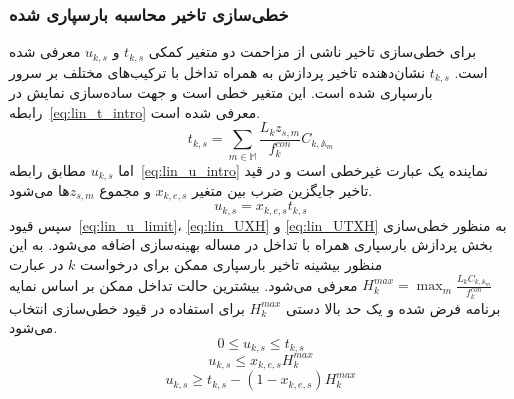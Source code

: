 \subsubsection{خطی‌سازی تاخیر محاسبه بارسپاری شده}
برای خطی‌سازی تاخیر ناشی از مزاحمت دو متغیر کمکی $t_{k,s}$ و $u_{k,s}$ معرفی شده است. $t_{k,s}$ نشان‌دهنده تاخیر پردازش به همراه تداخل با ترکیب‌های مختلف بر سرور بارسپاری شده است. این متغیر خطی است و جهت ساده‌سازی نمایش در رابطه~\eqref{eq:lin_t_intro} معرفی شده است.
\begin{equation} \label{eq:lin_t_intro}
    t_{k,s} = \sum_{m \in \mathbb{M}}\frac{L_k z_{s,m}}{f^{con}_k} C_{k,\mathbb{A}_m}
\end{equation}
اما $u_{k,s}$ مطابق رابطه~\eqref{eq:lin_u_intro} نماینده یک عبارت غیرخطی است و در قید تاخیر جایگزین ضرب بین متغیر $x_{k,e,s}$ و مجموع $z_{s,m}$ها می‌شود.
\begin{equation} \label{eq:lin_u_intro}
    u_{k,s} = x_{k,e,s} t_{k,s}
\end{equation}
سپس قیود~\eqref{eq:lin_u_limit}، \eqref{eq:lin_UXH} و \eqref{eq:lin_UTXH} به منظور خطی‌سازی بخش پردازش بارسپاری همراه با تداخل در مساله بهینه‌سازی اضافه می‌شود. به این منظور بیشینه تاخیر بارسپاری ممکن برای درخواست $k$ در عبارت $H^{max}_k = \max_m \frac{L_k C_{k,\mathbb{A}_m}}{f^{con}_k}$ معرفی می‌شود. بیشترین حالت تداخل ممکن بر اساس نمایه برنامه فرض شده و یک حد بالا دستی $H^{max}_k$ برای استفاده در قیود خطی‌سازی انتخاب می‌شود.
\begin{equation} \label{eq:lin_u_limit}
    0 \leq u_{k,s} \leq t_{k,s}
\end{equation}
\begin{equation} \label{eq:lin_UXH}
    u_{k,s} \leq x_{k,e,s} H^{max}_k
\end{equation}
\begin{equation} \label{eq:lin_UTXH}
    u_{k,s} \geq t_{k,s} - (1-x_{k,e,s}) H^{max}_k
\end{equation}

